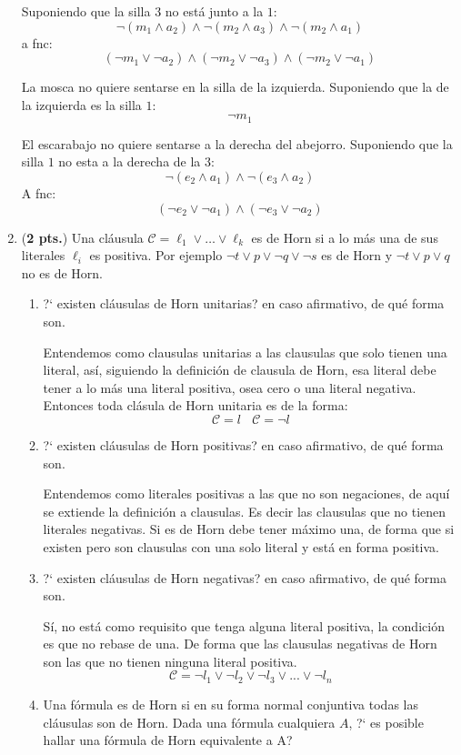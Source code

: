\documentclass[11pt,letterpaper]{article}
\begin{document}
\begin{enumerate}
Suponiendo que la silla $3$ no está junto a la $1$:
$$ \neg(m_1 \land a_2) \land \neg(m_2\land a_3) \land \neg(m_2\land a_1)$$
a fnc:
$$ (\neg m_1 \lor \neg a_2) \land (\neg m_2\lor \neg a_3) \land (\neg m_2\lor \neg a_1)$$

La mosca no quiere sentarse en la silla de la izquierda.
Suponiendo que la de la izquierda es la silla $1$:
$$ \neg m_1$$

El escarabajo no quiere sentarse a la derecha del abejorro.
Suponiendo que la silla $1$ no esta a la derecha de la $3$:
$$ \neg(e_2 \land a_1) \land \neg(e_3\land a_2)$$
A fnc:
$$ (\neg e_2 \lor \neg a_1) \land (\neg e_3\lor \neg a_2)$$
\medskip

\item(\textbf{2 pts.}) Una cláusula $\mathcal{C}=\ell_1\lor\ldots\lor\ell_k$ es de Horn si a lo más una de sus literales $\ell_i$ es positiva. Por ejemplo $\neg t\lor p\lor \neg q\lor \neg s$ es de Horn y $\neg t\lor p\lor q$ no es de Horn.
  \begin{enumerate}
  \item ?` existen cláusulas de Horn unitarias?  en caso afirmativo, de qué forma son.

    Entendemos como clausulas unitarias a las clausulas que solo tienen una literal, así, siguiendo la definición de clausula de Horn, esa literal
    debe tener a lo más una literal positiva, osea cero o una literal negativa. Entonces toda clásula de Horn unitaria es de la forma:
    $$\mathcal{C}= l\ \ \ \ \mathcal{C}=\neg l$$
  \item ?` existen cláusulas de Horn positivas?  en caso afirmativo, de qué forma son.

    Entendemos como literales positivas a las que no son negaciones, de aquí se extiende la definición a clausulas. Es decir las clausulas
    que no tienen literales negativas. Si es de Horn debe tener máximo una, de forma que si existen pero son clausulas con una solo literal
    y está en forma positiva.
  \item ?` existen cláusulas de Horn negativas?  en caso afirmativo, de qué forma son.

    Sí, no está como requisito que tenga alguna literal positiva, la condición es que no rebase de una. De forma que las clausulas negativas de Horn
    son las que no tienen ninguna literal positiva.
    $$\mathcal{C}= \neg l_1\lor \neg l_2 \lor \neg l_3 \lor ... \lor \neg l_n$$
  \item Una fórmula es de Horn si en su forma normal conjuntiva todas las cláusulas son de Horn. Dada una fórmula cualquiera $A$, ?` es posible hallar  una fórmula de Horn equivalente a A?


\end{enumerate}
\end{enumerate}
\end{document}
